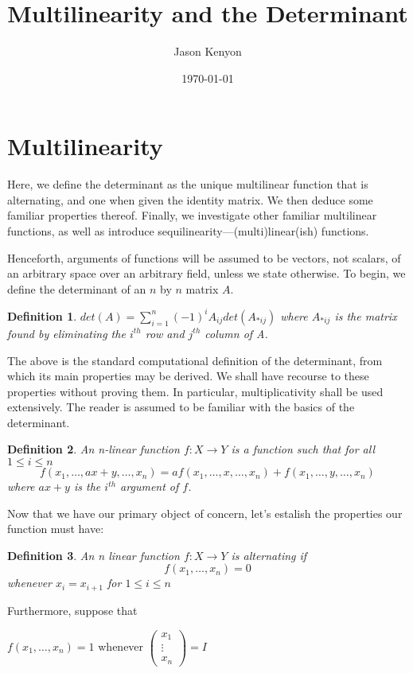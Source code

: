 \documentclass{article}
\title{Multilinearity and the Determinant}
\date{\today}
\author{Jason Kenyon}
\newtheorem{defn}{Definition}
\begin{document}
\maketitle
\section{Multilinearity}
Here, we define the determinant as the unique multilinear function that is alternating, and one when given the identity matrix.
We then deduce some familiar properties thereof. Finally, we investigate other familiar multilinear functions, as well as introduce sequilinearity---(multi)linear(ish) functions. 

Henceforth, arguments of functions will be assumed to be vectors, not scalars, of an arbitrary space over an arbitrary field,
unless we state otherwise. 
To begin, we define the determinant of an $n$ by $n$ matrix $A$.
\begin{defn}
$det(A)=\sum\limits_{i=1}^{n}(-1)^iA_{ij}det(A_{*ij})$ where $A_{*ij}$ is the matrix found by eliminating the $i^{th}$ row and $j^{th}$ column of A.
\end{defn}
The above is the standard computational definition of the determinant, from which its main properties may be derived. We shall have recourse to these properties without proving them. In particular, multiplicativity shall be used extensively. The reader is assumed to be familiar with the basics of the determinant.
\begin{defn}
An n-linear function $f:X \to Y$ is a function such that for all $1\leq i\leq n$ 
$$f(x_1, \dots, ax+y, \dots, x_n)=af(x_1, \dots, x, \dots, x_n)+f(x_1,\dots, y,\dots,x_n)$$
where $ax+y$ is the $i^{th}$ argument of $f$.
\end{defn}
Now that we have our primary object of concern, let's estalish the properties our function must have:
\begin{defn}
An n linear function $f:X \to Y$ is alternating if $$f(x_1, \dots, x_n)=0$$ whenever $x_i=x_{i+1}$ for $1\leq i\leq n$
\end{defn}
Furthermore, suppose that 

$f(x_1, \dots, x_n)=1$ whenever $\begin{pmatrix}
x_1 \\
\vdots \\
x_n
\end{pmatrix}=I$
\end{document}

